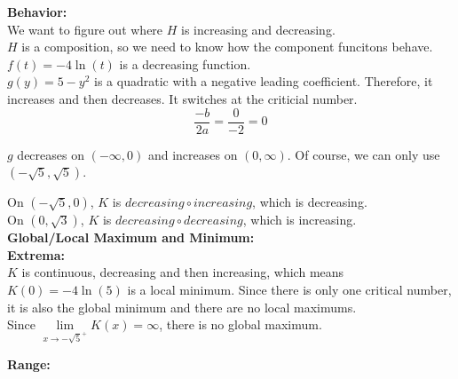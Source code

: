 \documentclass{ximera}
\begin{document}
\textbf{\textcolor{blue!55!black}{Behavior:}} \\


We want to figure out where $H$ is increasing and decreasing. \\

$H$ is a composition, so we need to know how the component funcitons behave. \\





$f(t) = -4 \ln(t)$ is a decreasing function. \\

$g(y) = 5 - y^2$ is a quadratic with a negative leading coefficient.  Therefore, it increases and then decreases.   It switches at the criticial number.\\



\[
\frac{-b}{2 a} = \frac{0}{-2} = 0
\]


$g$ decreases on $(-\infty, 0)$ and increases on $(0, \infty)$.  Of course, we can only use $(-\sqrt{5}, \sqrt{5})$.





On $(-\sqrt{5}, 0)$, $K$ is $decreasing \circ increasing$, which is decreasing. \\


On $(0, \sqrt{3})$, $K$ is $decreasing \circ decreasing$, which is increasing. \\








\textbf{\textcolor{blue!55!black}{Global/Local Maximum and Minimum:}} \\
\textbf{Extrema:} \\

$K$ is continuous, decreasing and then increasing, which means $K(0) = -4 \ln(5)$ is a local minimum. Since there is only one critical number, it is also the global minimum and there are no local maximums.\\



Since $\lim\limits_{x \to -\sqrt{5}^+} K(x) = \infty$,  there is no global maximum.












\textbf{\textcolor{blue!55!black}{Range:}} \\
\end{document}
